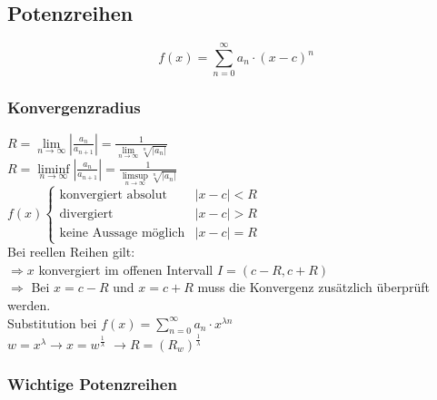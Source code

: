 \documentclass[6pt,a4paper]{scrartcl}
\newcommand{\abs}[1]{\ensuremath{\left\vert#1\right\vert}}
\newcommand{\Ra}[0]{\ensuremath{\Rightarrow}}
\begin{document}
\begin{multicols*}{2}
\subsection{Potenzreihen} %
\begin{multicols}{2}
\begin{equation*}
f(x)=\sum_{n=0}^\infty a_n \cdot (x-c)^n
\end{equation*}
\subsubsection{Konvergenzradius}
$R = \lim\limits_{n\rightarrow \infty} \abs{\frac{a_n}{a_{n+1}}}=\frac{1}{\lim\limits_{n\rightarrow \infty}\sqrt[n]{\abs{a_n}}}$ \\
$R =\liminf\limits_{n\rightarrow \infty} \abs{\frac{a_n}{a_{n+1}}}=\frac{1}{\limsup\limits_{n\rightarrow \infty}\sqrt[n]{\abs{a_n}}}$ \\
$f(x)\begin{cases}
	\text{konvergiert absolut} & \abs{x-c} < R \\
	\text{divergiert} & \abs{x-c} > R \\
	\text{keine Aussage möglich} & \abs{x-c} = R
	\end{cases}$\\
Bei reellen Reihen gilt: \\
$\Ra x$ konvergiert im offenen Intervall $I=(c-R,c+R)$ \\
$\Ra$ Bei $x=c-R$ und $x=c+R$ muss die Konvergenz zusätzlich überprüft werden.\\
Substitution bei $f(x)=\sum_{n=0}^\infty a_n \cdot x^{\lambda n}$ \\
$w=x^\lambda \rightarrow x=w^\frac{1}{\lambda}$
$\rightarrow R=\left(R_w\right)^\frac{1}{\lambda}$

\subsubsection{Wichtige Potenzreihen}
\label{sub:potenzreihen}


\end{multicols}
\end{multicols*}
\end{document}
